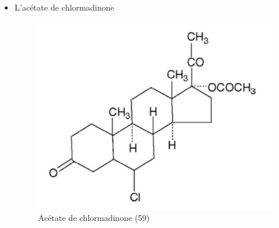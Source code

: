 \begin{itemize}[label={$\bullet$}, align=right]
\begin{itemize}[label={$\circ$}]
    \item L’acétate de chlormadinone 
    \begin{figure}[H]
      \centering
      \includegraphics{Images/fig_28.jpg}
      \caption{Acétate de chlormadinone (59)}
    \end{figure}

  \end{itemize}


\end{itemize}

